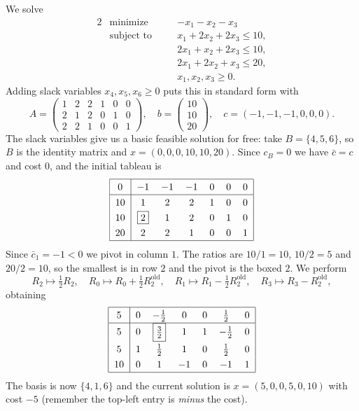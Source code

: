 \documentclass[a4paper]{scrartcl}
\begin{document}
\begin{example}
    We solve
    \begin{alignat*}{2}
        & \text{minimize} \quad && -x_1 - x_2 - x_3 \\
        & \text{subject to} \quad && x_1 + 2x_2 + 2x_3 \leq 10, \\
        & && 2x_1 + x_2 + 2x_3 \leq 10, \\
        & && 2x_1 + 2x_2 + x_3 \leq 20, \\
        & && x_1, x_2, x_3 \geq 0.
    \end{alignat*}
    Adding slack variables $x_4, x_5, x_6 \geq 0$ puts this in standard form with
    $$
    A = \begin{pmatrix} 1&2&2&1&0&0\\2&1&2&0&1&0\\2&2&1&0&0&1\end{pmatrix}, \quad b = \begin{pmatrix}10\\10\\20\end{pmatrix}, \quad c = (-1,-1,-1,0,0,0).
    $$
    The slack variables give us a basic feasible solution for free: take $B = \{4,5,6\}$, so $B$ is the identity matrix and $x = (0,0,0,10,10,20)$. Since $c_B = 0$ we have $\bar c = c$ and cost $0$, and the initial tableau is
    $$
    \arraycolsep=6pt\def\arraystretch{1.3}
    \begin{array}{|c|cccccc|}\hline
        0 & -1 & -1 & -1 & 0 & 0 & 0\\\hline
        10 & 1 & 2 & 2 & 1 & 0 & 0\\
        10 & \boxed{2} & 1 & 2 & 0 & 1 & 0\\
        20 & 2 & 2 & 1 & 0 & 0 & 1\\\hline
    \end{array}
    $$
    Since $\bar c_1 = -1 < 0$ we pivot in column $1$. The ratios are $10/1 = 10$, $10/2 = 5$ and $20/2 = 10$, so the smallest is in row $2$ and the pivot is the boxed $2$. We perform
    $$
    R_2 \mapsto \tfrac12 R_2, \quad R_0 \mapsto R_0 + \tfrac12 R_2^{\text{old}}, \quad R_1 \mapsto R_1 - \tfrac12 R_2^{\text{old}}, \quad R_3 \mapsto R_3 - R_2^{\text{old}},
    $$
    obtaining
    $$
    \arraycolsep=6pt\def\arraystretch{1.3}
    \begin{array}{|c|cccccc|}\hline
        5 & 0 & -\frac12 & 0 & 0 & \frac12 & 0\\\hline
        5 & 0 & \boxed{\tfrac32} & 1 & 1 & -\frac12 & 0\\
        5 & 1 & \frac12 & 1 & 0 & \frac12 & 0\\
        10 & 0 & 1 & -1 & 0 & -1 & 1\\\hline
    \end{array}
    $$
    The basis is now $\{4,1,6\}$ and the current solution is $x = (5,0,0,5,0,10)$ with cost $-5$ (remember the top-left entry is \emph{minus} the cost).


\end{example}
\end{document}
